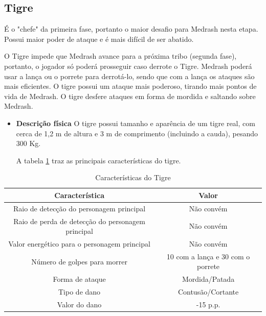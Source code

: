 \subsection{Tigre}
É o "chefe" da primeira fase, portanto o maior desafio para Medrash nesta etapa. Possui maior poder de ataque e é mais difícil de ser abatido.


O Tigre impede que Medrash avance para a próxima tribo (segunda fase), portanto, o jogador só poderá prosseguir caso derrote o Tigre. Medrash poderá usar a lança ou o porrete para derrotá-lo, sendo que com a lança os ataques são mais eficientes. O tigre possui um ataque mais poderoso, tirando mais pontos de vida de Medrash. O tigre desfere ataques em forma de mordida e saltando sobre Medrash.
\begin{itemize}
\item {\bf Descrição física}
O tigre possui tamanho e aparência de um tigre real, com cerca de 1,2 m de altura e 3 m de comprimento (incluindo a cauda), pesando 300 Kg.

A tabela \ref{table:tigre} traz as principais características do tigre.
\end{itemize}
\begin{table}[H]
\begin{center}
\begin{tabular}{|c|c|}
\hline 
\textbf{Característica} & \textbf{Valor} \\ 
\hline 
Raio de detecção do personagem principal & Não convém \\ 
\hline 
Raio de perda de detecção do personagem principal & Não convém \\ 
\hline 
Valor energético para o personagem principal & Não convém \\ 
\hline 
Número de golpes para morrer & 10 com a lança e 30 com o porrete \\ 
\hline 
Forma de ataque & Mordida/Patada\\ 
\hline 
Tipo de dano &  Contusão/Cortante \\ 
\hline 
Valor do dano & -15 p.p. \\ 
\hline 
\end{tabular} 
\end{center}
\caption{Características do Tigre}
\label{table:tigre}
\end{table}
